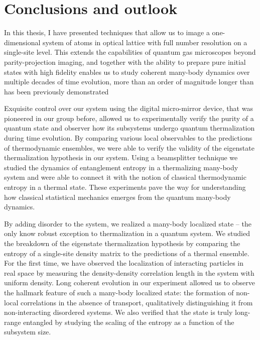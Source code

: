 
\chapter{Conclusions and outlook}

In this thesis, I have presented techniques that allow us to image a one-dimensional system of atoms in optical lattice with full number resolution on a single-site level. This extends the capabilities of quantum gas microscopes beyond parity-projection imaging, and together with the ability to prepare pure initial states with high fidelity enables us to study coherent many-body dynamics over multiple decades of time evolution, more than an order of magnitude longer than has been previously demonstrated

Exquisite control over our system using the digital micro-mirror device, that was pioneered in our group before, allowed us to experimentally verify the purity of a quantum state and observer how its subsystems undergo quantum thermalization during time evolution. By comparing various local observables to the predictions of thermodynamic ensembles, we were able to verify the validity of the eigenstate thermalization hypothesis in our system. Using a beamsplitter technique we studied the dynamics of entanglement entropy in a thermalizing many-body system and were able to connect it with the notion of classical thermodynamic entropy in a thermal state. These experiments pave the way for understanding how classical statistical mechanics emerges from the quantum many-body dynamics.

By adding disorder to the system, we realized a many-body localized state -- the only know robust exception to thermalization in a quantum system. We studied the breakdown of the eigenstate thermalization hypothesis by comparing the entropy of a single-site density matrix to the predictions of a thermal ensemble. For the first time, we have observed the localization of interacting particles in real space by measuring the density-density correlation length in the system with uniform density. Long coherent evolution in our experiment allowed us to observe the hallmark feature of such a many-body localized state: the formation of non-local correlations in the absence of transport, qualitatively distinguishing it from non-interacting disordered systems. We also verified that the state is truly long-range entangled by studying the scaling of the entropy as a function of the subsystem size.

